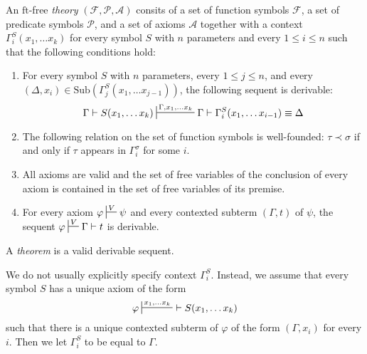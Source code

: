 \documentclass[reqno]{amsart}
\theoremstyle{definition}
\theoremstyle{remark}
\newcommand{\fs}[1]{\mathrm{#1}}
\newcommand{\ft}{\fs{ft}}
\newcommand{\sub}{\fs{Sub}}
\numberwithin{figure}{section}
\begin{document}
\begin{defn}[ft-free]
An $\ft$-free \emph{theory} $(\mathcal{F},\mathcal{P},\mathcal{A})$ consits of a set of function symbols $\mathcal{F}$, a set of predicate symbols $\mathcal{P}$, and a set of axioms $\mathcal{A}$
together with a context $\Gamma^S_i(x_1, \ldots x_k)$ for every symbol $S$ with $n$ parameters and every $1 \leq i \leq n$ such that the following conditions hold:
\begin{enumerate}
\item \label{it:ax-consist} For every symbol $S$ with $n$ parameters, every $1 \leq j \leq n$, and every $(\Delta,x_i) \in \sub(\Gamma_j^S(x_1, \ldots x_{j-1}))$, the following sequent is derivable:
\[ \Gamma \vdash S(x_1, \ldots x_k) \sststile{}{\Gamma, x_1, \ldots x_k} \Gamma \vdash \Gamma_i^S(x_1, \ldots x_{i-1}) \equiv \Delta \]
\item \label{it:ax-wf} The following relation on the set of function symbols is well-founded: $\tau \prec \sigma$ if and only if $\tau$ appears in $\Gamma^\sigma_i$ for some $i$.
\item \label{it:ax-valid} All axioms are valid and the set of free variables of the conclusion of every axiom is contained in the set of free variables of its premise.
\item \label{it:ax-cond} For every axiom $\varphi \sststile{}{V} \psi$ and every contexted subterm $(\Gamma,t)$ of $\psi$, the sequent $\varphi \sststile{}{V} \Gamma \vdash t$ is derivable.
\end{enumerate}
A \emph{theorem} is a valid derivable sequent.
\end{defn}

We do not usually explicitly specify context $\Gamma^S_i$.
Instead, we assume that every symbol $S$ has a unique axiom of the form
\[ \varphi \sststile{}{x_1, \ldots x_k}\ \vdash S(x_1, \ldots x_k) \]
such that there is a unique contexted subterm of $\varphi$ of the form $(\Gamma,x_i)$ for every $i$.
Then we let $\Gamma^S_i$ to be equal to $\Gamma$.
\end{document}
